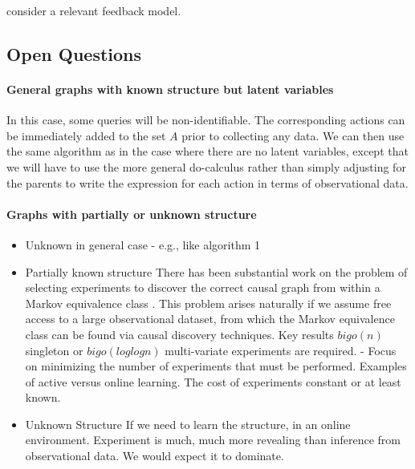\cite{wu2015online} consider a relevant feedback model. 


\subsection{Open Questions}


\paragraph{General graphs with known structure but latent variables}
In this case, some queries will be non-identifiable. The corresponding actions can be immediately added to the set $A$ prior to collecting any data. We can then use the same algorithm as in the case where there are no latent variables, except that we will have to use the more general do-calculus rather than simply adjusting for the parents to write the expression for each action in terms of observational data. 

\paragraph{Graphs with partially or unknown structure}

\begin{itemize}

\item Unknown in general case - e.g., like algorithm 1

\item Partially known structure
There has been substantial work on the problem of selecting experiments to discover the correct causal graph from within a Markov equivalence class \cite{Eberhardt2005,eberhardt2010causal,hauser2014two,Hu2014}. This problem arises naturally if we assume free access to a large observational dataset, from which the Markov equivalence class can be found via causal discovery techniques. Key results $bigo(n)$ singleton or $bigo(log log n)$ multi-variate experiments are required.
- Focus on minimizing the number of experiments that must be performed. Examples of active versus online learning. The cost of experiments constant or at least known. 

\item Unknown Structure
If we need to learn the structure, in an online environment. 
Experiment is much, much more revealing than inference from observational data. We would expect it to dominate. 

\end{itemize}

